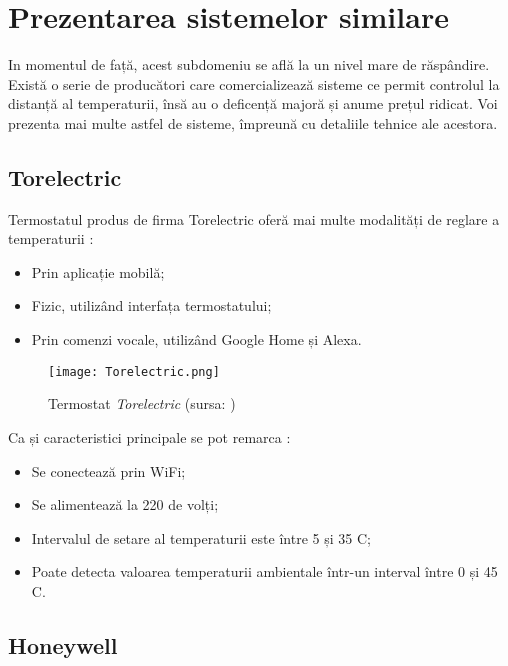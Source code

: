 \chapter{Prezentarea sistemelor similare}\label{ch:2sistemeSimilare}

	In momentul de față, acest subdomeniu se află la un nivel mare de răspândire. Există o serie de producători care comercializează sisteme ce permit controlul la distanță al temperaturii, însă au o deficență majoră și anume prețul ridicat. Voi prezenta mai multe astfel de sisteme, împreună cu detaliile tehnice ale acestora. 	

\section{Torelectric}
	Termostatul produs de firma Torelectric oferă mai multe modalități de reglare a temperaturii \cite{torelectric}:
	\begin{itemize}
  	\setlength{\itemindent}{2em}
		\itemsep0em
		\item Prin aplicație mobilă;
		\item Fizic, utilizând interfața termostatului;
		\item Prin comenzi vocale, utilizând Google Home și Alexa.
	\end{itemize}
	

	\begin{figure}[H]
    		\centering
    		\texttt{[image: Torelectric.png]}
		\caption{Termostat \textit{Torelectric} (sursa: \cite{torelectric})}
	\end{figure}

\vspace{2em}

	Ca și caracteristici principale se pot remarca \cite{torelectric}:
	\begin{itemize}
	\setlength{\itemindent}{2em}
		\itemsep0em
		\item Se conectează prin WiFi;
		\item Se alimentează la 220 de volți;
		\item Intervalul de setare al temperaturii este între 5 și 35 \textdegree{}C;
		\item Poate detecta valoarea temperaturii ambientale într-un interval între 0 și 45 \textdegree{}C.
	\end{itemize}

\section{Honeywell}

